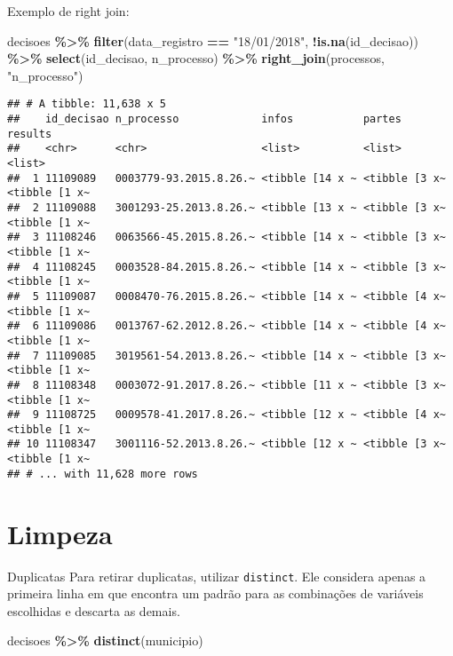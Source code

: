 \documentclass[
  10pt,
  ignorenonframetext,
]{beamer}
\newenvironment{Shaded}{\begin{snugshade}}{\end{snugshade}}
\newcommand{\KeywordTok}[1]{\textcolor[rgb]{0.13,0.29,0.53}{\textbf{#1}}}
\newcommand{\NormalTok}[1]{#1}
\newcommand{\OperatorTok}[1]{\textcolor[rgb]{0.81,0.36,0.00}{\textbf{#1}}}
\newcommand{\StringTok}[1]{\textcolor[rgb]{0.31,0.60,0.02}{#1}}
\begin{document}
\begin{frame}[fragile]{Exemplo de right join:}
\protect\hypertarget{exemplo-de-right-join}{}
\begin{Shaded}
\begin{Highlighting}[]
\NormalTok{decisoes }\OperatorTok{\%\textgreater{}\%}\StringTok{ }
\StringTok{  }\KeywordTok{filter}\NormalTok{(data\_registro }\OperatorTok{==}\StringTok{ "18/01/2018"}\NormalTok{, }\OperatorTok{!}\KeywordTok{is.na}\NormalTok{(id\_decisao)) }\OperatorTok{\%\textgreater{}\%}\StringTok{ }
\StringTok{  }\KeywordTok{select}\NormalTok{(id\_decisao, n\_processo) }\OperatorTok{\%\textgreater{}\%}\StringTok{ }
\StringTok{  }\KeywordTok{right\_join}\NormalTok{(processos, }\StringTok{"n\_processo"}\NormalTok{)}
\end{Highlighting}
\end{Shaded}
\end{frame}

\begin{frame}[fragile]{}
\protect\hypertarget{section-9}{}
\begin{verbatim}
## # A tibble: 11,638 x 5
##    id_decisao n_processo             infos           partes        results      
##    <chr>      <chr>                  <list>          <list>        <list>       
##  1 11109089   0003779-93.2015.8.26.~ <tibble [14 x ~ <tibble [3 x~ <tibble [1 x~
##  2 11109088   3001293-25.2013.8.26.~ <tibble [13 x ~ <tibble [3 x~ <tibble [1 x~
##  3 11108246   0063566-45.2015.8.26.~ <tibble [14 x ~ <tibble [3 x~ <tibble [1 x~
##  4 11108245   0003528-84.2015.8.26.~ <tibble [14 x ~ <tibble [3 x~ <tibble [1 x~
##  5 11109087   0008470-76.2015.8.26.~ <tibble [14 x ~ <tibble [4 x~ <tibble [1 x~
##  6 11109086   0013767-62.2012.8.26.~ <tibble [14 x ~ <tibble [4 x~ <tibble [1 x~
##  7 11109085   3019561-54.2013.8.26.~ <tibble [14 x ~ <tibble [3 x~ <tibble [1 x~
##  8 11108348   0003072-91.2017.8.26.~ <tibble [11 x ~ <tibble [3 x~ <tibble [1 x~
##  9 11108725   0009578-41.2017.8.26.~ <tibble [12 x ~ <tibble [4 x~ <tibble [1 x~
## 10 11108347   3001116-52.2013.8.26.~ <tibble [12 x ~ <tibble [3 x~ <tibble [1 x~
## # ... with 11,628 more rows
\end{verbatim}
\end{frame}

\hypertarget{limpeza}{%
\section{Limpeza}\label{limpeza}}

\begin{frame}[fragile]{Duplicatas}
\protect\hypertarget{duplicatas-1}{}
Para retirar duplicatas, utilizar \texttt{distinct}. Ele considera
apenas a primeira linha em que encontra um padrão para as combinações de
variáveis escolhidas e descarta as demais.

\begin{Shaded}
\begin{Highlighting}[]
\NormalTok{decisoes }\OperatorTok{\%\textgreater{}\%}\StringTok{ }
\StringTok{  }\KeywordTok{distinct}\NormalTok{(municipio)}
\end{Highlighting}
\end{Shaded}
\end{frame}
\end{document}

